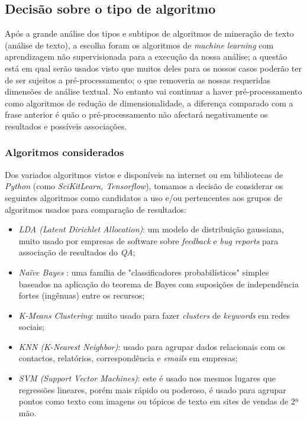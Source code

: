 \subsection{Decisão sobre o tipo de algoritmo}

Após a grande análise dos tipos e subtipos de algoritmos de mineração de texto (análise de texto), a escolha foram os algoritmos de \textit{machine learning} com aprendizagem não supervisionada para a execução da nossa análise; a questão está em qual serão usados visto que muitos deles para os nossos casos poderão ter de ser sujeitos a pré-processamento; o que removeria as nossas requeridas dimensões de análise textual.
No entanto vai continuar a haver pré-processamento como algoritmos de redução de dimensionalidade, a diferença comparado com a frase anterior é quão o pré-processamento não afectará negativamente os resultados e possíveis associações.

\subsubsection{Algoritmos considerados}

Dos variados algoritmos vistos e disponíveis na internet ou em bibliotecas de \textit{Python} (como \textit{SciKitLearn, Tensorflow}), tomamos a decisão de considerar os seguintes algoritmos como candidatos a uso e/ou pertencentes aos grupos de algoritmos usados para comparação de resultados:
\begin{itemize}
  \setlength\itemsep{0.05em}
  \item \textit{LDA (Latent Dirichlet Allocation)}: um modelo de distribuição gaussiana, muito usado por empresas de software sobre \textit{feedback} e \textit{bug reports} para associação de resultados do \textit{QA};
  \item \textit{Naïve Bayes} \cite{mbn1}: uma família de "classificadores probabilísticos" simples baseados na aplicação do teorema de Bayes com suposições de independência fortes (ingênuas) entre os recursos;
  \item \textit{K-Means Clustering}: muito usado para fazer \textit{clusters} de \textit{keywords} em redes sociais;
  \item \textit{KNN (K-Nearest Neighbor)}: usado para agrupar dados relacionais com os contactos, relatórios, correspondência e \textit{emails} em empresas;
  \item \textit{SVM (Support Vector Machines)}: este é usado nos mesmos lugares que regressões lineares, porém mais rápido ou poderoso, é usado para agrupar pontos como texto com imagens ou tópicos de texto em sites de vendas de 2ª mão.
\end{itemize}

